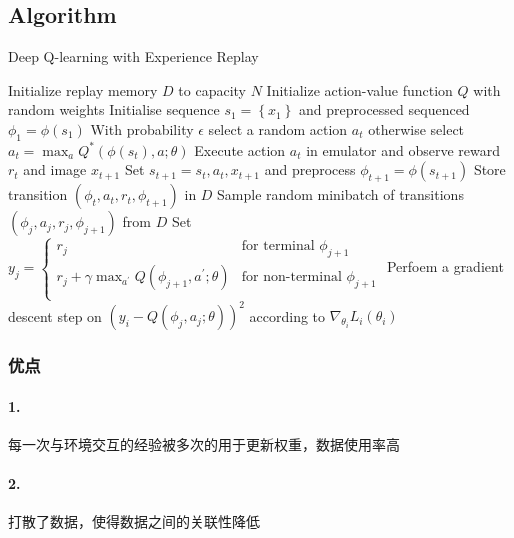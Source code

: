 \documentclass{article} %
\begin{document}
\begin{CJK*}{UTF8}{gkai}
\subsection{Algorithm}
\begin{algorithm}
    \caption{Deep Q-learning with Experience Replay}
    \label{alg1}
    \begin{algorithmic}
        \STATE Initialize replay memory $D$ to capacity $N$
        \STATE Initialize action-value function $Q$ with random weights
            \STATE Initialise sequence $s_{1}=\left\lbrace x _{1} \right\rbrace$ and preprocessed sequenced $\phi _{1}=\phi\left(s _{1}\right)$
                \STATE With probability $\epsilon$ select a random action $a _{t}$
                \STATE otherwise select $a _{t}=\max _{a}Q ^{*}\left(\phi\left(s _{t}\right),a;\theta\right)$ 
                \STATE Execute action $a _{t}$ in emulator and observe reward $r _{t}$ and image $x _{t+1}$
                \STATE Set $s _{t+1}=s _{t},a _{t},x _{t+1}$ and preprocess $\phi _{t+1}=\phi\left(s _{t+1}\right)$
                \STATE Store transition $\left(\phi _{t},a _{t},r _{t},\phi _{t+1}\right)$ in $D$
                \STATE Sample random minibatch of transitions $\left(\phi _{j},a _{j},r _{j},\phi _{j+1}\right)$ from $D$
                \STATE Set $y _{j}=
                    \begin{cases}
                        r _{j}& \text{for terminal $\phi _{j+1}$}\\
                        r _{j} + \gamma \max _{a ^{\prime}}Q\left(\phi _{j+1},a ^{\prime};\theta\right)& \text{for non-terminal $\phi _{j+1}$}\\
                    \end{cases}$
                \STATE Perfoem a gradient descent step on $\left(y _{i}-Q\left(\phi _{j},a _{j};\theta\right)\right) ^{2}$ according to $\nabla _{\theta _{i}}L _{i} \left(\theta _{i}\right)$
            \ENDFOR
        \ENDFOR
    \end{algorithmic}
\end{algorithm}
\subsubsection{优点}
\paragraph{1.}每一次与环境交互的经验被多次的用于更新权重，数据使用率高
\paragraph{2.}打散了数据，使得数据之间的关联性降低

\end{CJK*}
\end{document}
